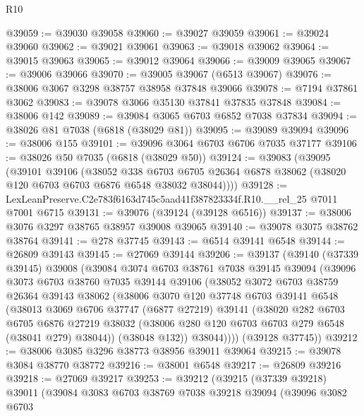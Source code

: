 \begin{lexlean}{R10}
\begin{coremodule}
@39059 := @39030 @39058
@39060 := @39027 @39059
@39061 := @39024 @39060
@39062 := @39021 @39061
@39063 := @39018 @39062
@39064 := @39015 @39063
@39065 := @39012 @39064
@39066 := @39009 @39065
@39067 := @39006 @39066
@39070 := @39005 @39067 (@6513 @39067)
@39076 := @38006 @3067 @3298 @38757 @38958 @37848 @39066
@39078 := @7194 @37861 @3062
@39083 := @39078 @3066 @35130 @37841 @37835 @37848
@39084 := @38006 @142
@39089 := @39084 @3065 @6703 @6852 @7038 @37834
@39094 := @38026 @81 @7038 (@6818 (@38029 @81))
@39095 := @39089 @39094
@39096 := @38006 @155
@39101 := @39096 @3064 @6703 @6706 @7035 @37177
@39106 := @38026 @50 @7035 (@6818 (@38029 @50))
@39124 := @39083
    (@39095
      (@39101
        @39106
        (@38052
          @338
          @6703
          @6705
          @26364
          @6878
          @38062
          (@38020 @120 @6703 @6703 @6876 @6548 @38032 @38044))))
@39128 := LexLeanPreserve.C2e783f6163d745c5aad41f387823334f.R10.__rel_25 @7011 @7001 @6715
@39131 := @39076 (@39124 (@39128 @6516))
@39137 := @38006 @3076 @3297 @38765 @38957 @39008 @39065
@39140 := @39078 @3075 @38762 @38764
@39141 := @278 @37745
@39143 := @6514 @39141 @6548
@39144 := @26809 @39143
@39145 := @27069 @39144
@39206 := @39137
    (@39140
      (@37339 @39145)
      @39008
      (@39084
        @3074
        @6703
        @38761
        @7038
        @39145
        @39094
        (@39096
          @3073
          @6703
          @38760
          @7035
          @39144
          @39106
          (@38052
            @3072
            @6703
            @38759
            @26364
            @39143
            @38062
            (@38006
              @3070
              @120
              @37748
              @6703
              @39141
              @6548
              (@38013
                @3069
                @6706
                @37747
                (@6877 @27219)
                @39141
                (@38020
                  @282
                  @6703
                  @6705
                  @6876
                  @27219
                  @38032
                  (@38006 @280 @120 @6703 @6703 @279 @6548 (@38041 @279) @38044))
                (@38048 @132))
              @38044))))
      (@39128 @37745))
@39212 := @38006 @3085 @3296 @38773 @38956 @39011 @39064
@39215 := @39078 @3084 @38770 @38772
@39216 := @38001 @6548
@39217 := @26809 @39216
@39218 := @27069 @39217
@39253 := @39212
    (@39215
      (@37339 @39218)
      @39011
      (@39084
        @3083
        @6703
        @38769
        @7038
        @39218
        @39094
        (@39096
          @3082
          @6703

\end{coremodule}
\end{lexlean}
